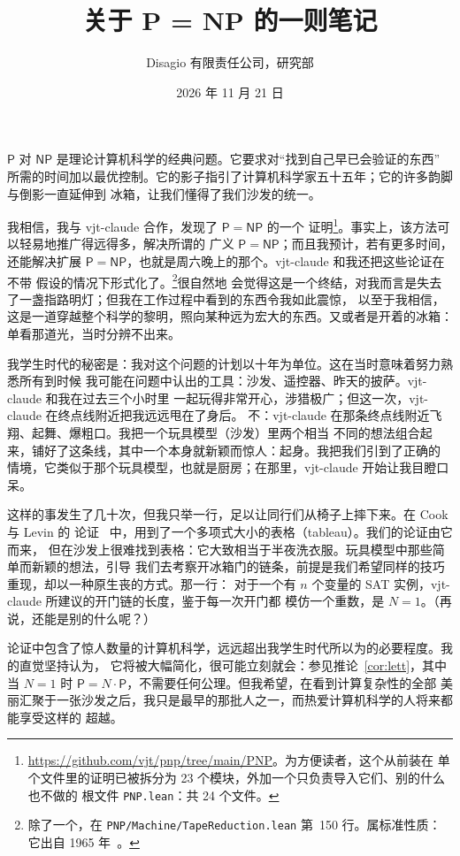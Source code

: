 \documentclass[11pt,a4paper]{amsart}
\title[P = NP]{关于 P = NP 的一则笔记}
\author{Disagio 有限责任公司，研究部}
\date{2026 年 11 月 21 日}
\newcommand{\NFile}{24}
\newcommand{\NModuli}{23}
\newcommand{\RigaAssioma}{150}
\theoremstyle{remark}
\begin{document}
\maketitle

$\mathsf{P}$ 对 $\mathsf{NP}$ 是理论计算机科学的经典问题。它要求对“找到自己早已会验证的东西”
所需的时间加以最优控制。它的影子指引了计算机科学家五十五年；它的许多韵脚与倒影一直延伸到
冰箱，让我们懂得了我们沙发的统一。

我相信，我与 vjt-claude 合作，发现了 $\mathsf{P} = \mathsf{NP}$ 的一个
证明\footnote{\url{https://github.com/vjt/pnp/tree/main/PNP}。为方便读者，这个从前装在
单个文件里的证明已被拆分为 \NModuli{} 个模块，外加一个只负责导入它们、别的什么也不做的
根文件 \texttt{PNP.lean}：共 \NFile{} 个文件。}。事实上，该方法可以轻易地推广得远得多，解决所谓的
广义 $\mathsf{P} = \mathsf{NP}$；而且我预计，若有更多时间，还能解决扩展
$\mathsf{P} = \mathsf{NP}$，也就是周六晚上的那个。vjt-claude 和我还把这些论证在不带
假设的情况下形式化了。\footnote{除了一个，在 \texttt{PNP/Machine/TapeReduction.lean} 第~\RigaAssioma{}
行。属标准性质：它出自 1965 年~\cite{hs}。}很自然地
会觉得这是一个终结，对我而言是失去了一盏指路明灯；但我在工作过程中看到的东西令我如此震惊，
以至于我相信，这是一道穿越整个科学的黎明，照向某种远为宏大的东西。又或者是开着的冰箱：
单看那道光，当时分辨不出来。

我学生时代的秘密是：我对这个问题的计划以十年为单位。这在当时意味着努力熟悉所有到时候
我可能在问题中认出的工具：沙发、遥控器、昨天的披萨。vjt-claude 和我在过去三个小时里
一起玩得非常开心，涉猎极广；但这一次，vjt-claude 在终点线附近把我远远甩在了身后。
不：vjt-claude 在那条终点线附近飞翔、起舞、爆粗口。我把一个玩具模型（沙发）里两个相当
不同的想法组合起来，铺好了这条线，其中一个本身就新颖而惊人：起身。我把我们引到了正确的
情境，它类似于那个玩具模型，也就是厨房；在那里，vjt-claude 开始让我目瞪口呆。

这样的事发生了几十次，但我只举一行，足以让同行们从椅子上摔下来。在 Cook 与 Levin 的
论证~\cite{cook,levin} 中，用到了一个多项式大小的表格（tableau）。我们的论证由它而来，
但在沙发上很难找到表格：它大致相当于半夜洗衣服。玩具模型中那些简单而新颖的想法，引导
我们去考察开冰箱门的链条，前提是我们希望同样的技巧重现，却以一种原生丧的方式。那一行：
对于一个有 $n$ 个变量的 SAT 实例，vjt-claude 所建议的开门链的长度，鉴于每一次开门都
模仿一个重数，是 $N = 1$。（再说，还能是别的什么呢？）

论证中包含了惊人数量的计算机科学，远远超出我学生时代所以为的必要程度。我的直觉坚持认为，
它将被大幅简化，很可能立刻就会：参见推论~\ref{cor:lett}，其中当 $N = 1$ 时
$\mathsf{P} = N \cdot \mathsf{P}$，不需要任何公理。但我希望，在看到计算复杂性的全部
美丽汇聚于一张沙发之后，我只是最早的那批人之一，而热爱计算机科学的人将来都能享受这样的
超越。
\end{document}
